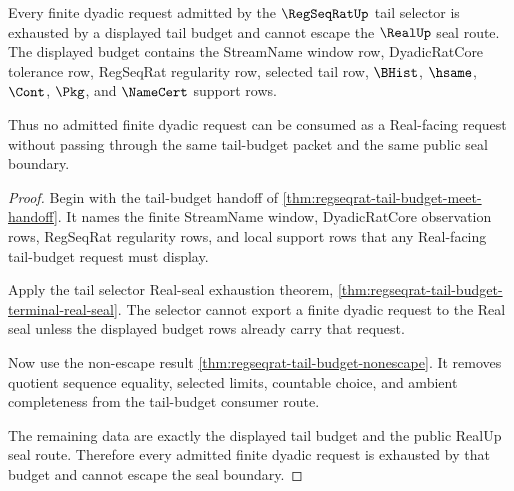 \begin{theorem}
\label{thm:regseqrat-tail-budget-exhaustion}
Every finite dyadic request admitted by the $\RegSeqRatUp$ tail selector is exhausted by a displayed tail budget and cannot escape the $\RealUp$ seal route. The displayed budget contains the StreamName window row, DyadicRatCore tolerance row, RegSeqRat regularity row, selected tail row, $\BHist$, $\hsame$, $\Cont$, $\Pkg$, and $\NameCert$ support rows.

Thus no admitted finite dyadic request can be consumed as a Real-facing request without passing through the same tail-budget packet and the same public seal boundary.
\end{theorem}
\begin{proof}
Begin with the tail-budget handoff of \autoref{thm:regseqrat-tail-budget-meet-handoff}. It names the finite StreamName window, DyadicRatCore observation rows, RegSeqRat regularity rows, and local support rows that any Real-facing tail-budget request must display.

Apply the tail selector Real-seal exhaustion theorem, \autoref{thm:regseqrat-tail-budget-terminal-real-seal}. The selector cannot export a finite dyadic request to the Real seal unless the displayed budget rows already carry that request.

Now use the non-escape result \autoref{thm:regseqrat-tail-budget-nonescape}. It removes quotient sequence equality, selected limits, countable choice, and ambient completeness from the tail-budget consumer route.

The remaining data are exactly the displayed tail budget and the public RealUp seal route. Therefore every admitted finite dyadic request is exhausted by that budget and cannot escape the seal boundary.
\end{proof}
